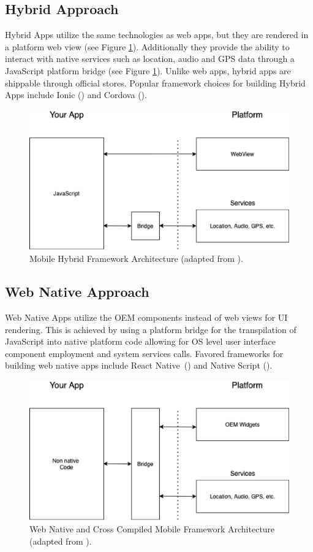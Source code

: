 \subsection{Hybrid Approach}
Hybrid Apps utilize the same technologies as web apps, but they are rendered in a platform web view (see Figure \ref{fig:hybrid_architecture}). Additionally they provide the ability to 
interact with native services such as location, audio and GPS data through a JavaScript platform bridge (see Figure \ref{fig:hybrid_architecture}).
Unlike web apps, hybrid apps are shippable through official stores.
Popular framework choices for building Hybrid Apps include Ionic (\cite{Ionic2021}) and Cordova (\cite{Cordova2020}).

\begin{figure}
    \centering
    \includegraphics[width=.8\linewidth]{images/architectures/hybrid_architecture.eps}
    \caption{Mobile Hybrid Framework Architecture (adapted from \cite{Cunha2018}).}
    \label{fig:hybrid_architecture}
\end{figure}

\subsection{Web Native Approach} \label{subsection::web_native_apps}
Web Native Apps utilize the OEM components instead of web views for UI rendering.
This is achieved by using a platform bridge for the transpilation of JavaScript into native platform code allowing for OS level user interface component employment
and system services calls. 
Favored frameworks for building web native apps include React Native~(\cite{ReactNative2021}) and Native Script (\cite{NativeScript2021}).

\begin{figure}
    \centering
    \includegraphics[width=.8\linewidth]{images/architectures/native_web_app_architecture.eps}
    \caption{Web Native and Cross Compiled Mobile Framework Architecture (adapted from \cite{Cunha2018}).}
    \label{fig:web_native_architecture}
\end{figure}

